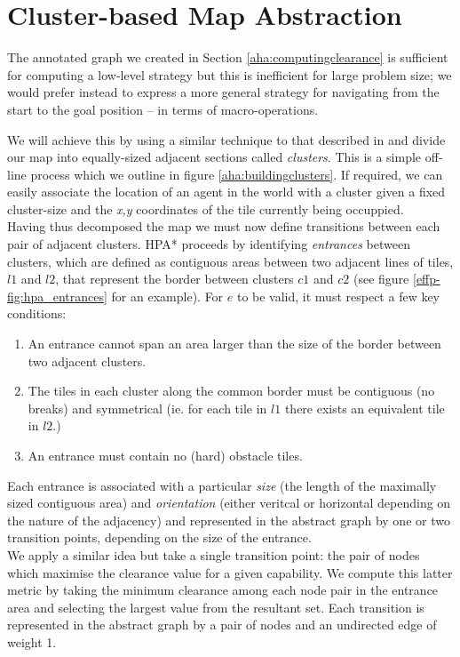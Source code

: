\section{Cluster-based Map Abstraction}
\label{aha:mapabstraction}
The annotated graph we created in Section \ref{aha:computingclearance} is sufficient for computing a low-level strategy but this is inefficient for large problem size; we would prefer instead to express a more general strategy for navigating from the start to the goal position -- in terms of macro-operations.

We will achieve this by using a similar technique to that described in \cite{botea04} and divide our map into equally-sized adjacent sections called \emph{clusters}. This is a simple off-line process which we outline in figure \ref{aha:buildingclusters}. If required, we can easily associate the location of an agent in the world with a cluster given a fixed cluster-size and the \emph{x,y} coordinates of the tile currently being occuppied.\\ \newline
Having thus decomposed the map we must now define transitions between each pair of adjacent clusters. HPA* proceeds by identifying \emph{entrances} between clusters, which are defined as contiguous areas between two adjacent lines of tiles, $l1$ and $l2$, that represent the border between clusters $c1$ and $c2$ (see figure \ref{effp-fig:hpa_entrances} for an example). For $e$ to be valid, it must respect a few key conditions:
\begin{enumerate}
\item{An entrance cannot span an area larger than the size of the border between two adjacent clusters.}
\item{The tiles in each cluster along the common border must be contiguous (no breaks) and symmetrical (ie. for each tile in $l1$ there exists an equivalent tile in $l2$.)}
\item{An entrance must contain no (hard) obstacle tiles.}
\end{enumerate}
Each entrance is associated with a particular \emph{size} (the length of the maximally sized contiguous area) and \emph{orientation} (either veritcal or horizontal depending on the nature of the adjacency) and represented in the abstract graph by one or two transition points, depending on the size of the entrance. \\ \newline
We apply a similar idea but take a single transition point: the pair of nodes which maximise the clearance value for a given capability. We compute this latter metric by taking the minimum clearance among each node pair in the entrance area and selecting the largest value from the resultant set. Each transition is represented in the abstract graph by a pair of nodes and an undirected edge of weight 1.\\
